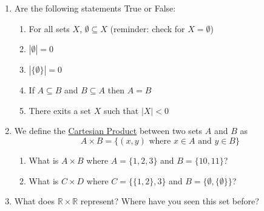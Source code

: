 \documentclass{article}
\begin{document}
\begin{enumerate}[label=(\alph*)]
    \item Are the following statements True or False:
          \begin{enumerate}[label=(\roman*)]
              \item For all sets $X$, $\emptyset \subseteq X$ (reminder: check for $X = \emptyset$)
              \item $|\emptyset| = 0$
              \item $|\{\emptyset\}| = 0$
              \item If $A \subseteq B$ and $B \subseteq A$ then $A = B$
              \item There exits a set $X$ such that $|X| < 0$
          \end{enumerate}
    \item We define the \underline{Cartesian Product} between two sets
          $A$ and $B$ as
          \begin{equation*}
              A \times B = \{(x,y) \text{ where } x \in A \text{ and } y \in B\}
          \end{equation*}
          \begin{enumerate}[label=(\roman*)]
              \item What is $A \times B$ where $A = \{1, 2, 3\}$ and $B = \{10, 11\}$?
              \item What is $C \times D$ where $C = \{ \{1, 2\}, 3\}$ and $B = \{\emptyset, \{\emptyset\}\}$?
          \end{enumerate}
    \item What does $\mathbb{R} \times \mathbb{R}$ represent? Where have you seen this set before?


\end{enumerate}
\end{document}
